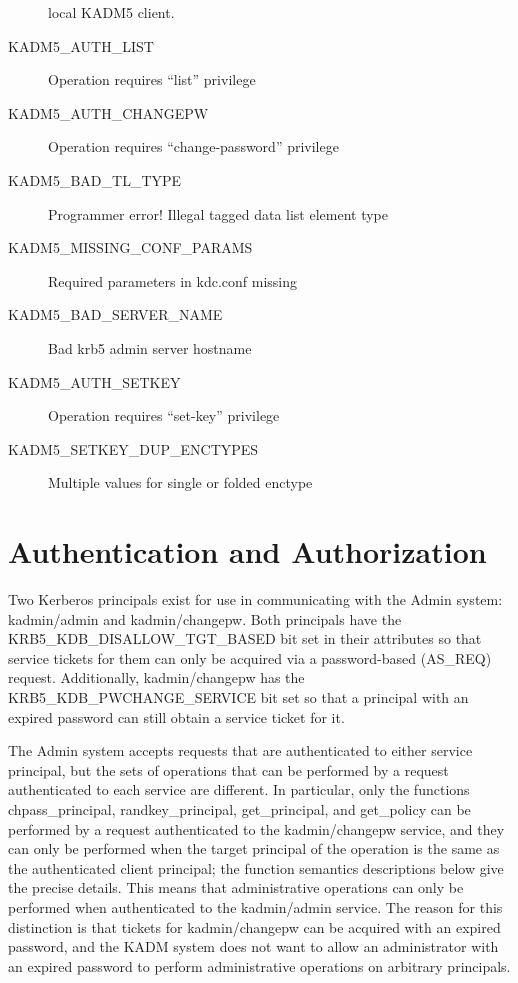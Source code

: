 \begin{description}
local KADM5 client.
\item[KADM5_AUTH_LIST] Operation requires ``list'' privilege
\item[KADM5_AUTH_CHANGEPW] Operation requires ``change-password'' privilege
\item[KADM5_BAD_TL_TYPE] Programmer error!  Illegal tagged data list
element type
\item[KADM5_MISSING_CONF_PARAMS] Required parameters in kdc.conf missing
\item[KADM5_BAD_SERVER_NAME] Bad krb5 admin server hostname
\item[KADM5_AUTH_SETKEY] Operation requires ``set-key'' privilege
\item[KADM5_SETKEY_DUP_ENCTYPES] Multiple values for single or folded enctype
\end{description}

\section{Authentication and Authorization}
\label{sec:auth}

Two Kerberos principals exist for use in communicating with the Admin
system: kadmin/admin and kadmin/changepw.  Both principals
have the KRB5_KDB_DISALLOW_TGT_BASED bit set in their attributes so
that service tickets for them can only be acquired via a
password-based (AS_REQ) request.  Additionally, kadmin/changepw
has the KRB5_KDB_PWCHANGE_SERVICE bit set so that a principal with an
expired password can still obtain a service ticket for it.

The Admin system accepts requests that are authenticated to either
service principal, but the sets of operations that can be performed by
a request authenticated to each service are different.  In particular,
only the functions chpass_principal, randkey_principal, get_principal,
and get_policy can be performed by a request authenticated to the
kadmin/changepw service, and they can only be performed when the
target principal of the operation is the same as the authenticated
client principal; the function semantics descriptions below give the
precise details.  This means that administrative operations can only
be performed when authenticated to the kadmin/admin service.  The
reason for this distinction is that tickets for kadmin/changepw can be
acquired with an expired password, and the KADM system does not want
to allow an administrator with an expired password to perform
administrative operations on arbitrary principals.

